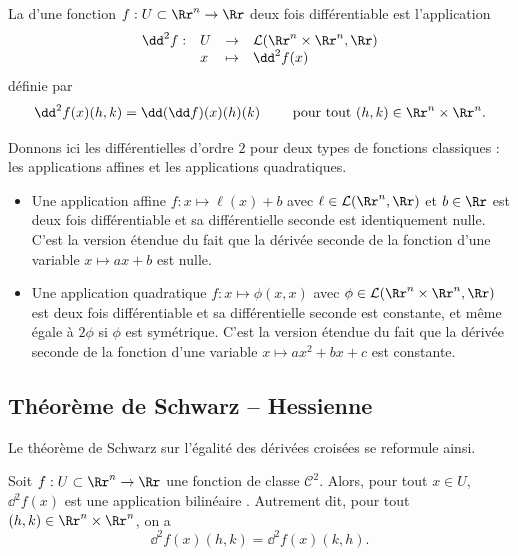 \documentclass[11pt, class=report,crop=false]{standalone}
\begin{document}
\begin{definition}
La  d'une fonction $f: U \subset \Rr^n \to \Rr$ deux fois différentiable est l'application
$$\begin{array}{clll}
\dd^2 f : & U & \rightarrow & \mathcal{L}(\Rr^n \times \Rr^n,\Rr) \\
          & x & \mapsto & \dd^2 f(x)
\end{array}$$
définie par
$$\dd^2f(x)(h,k) = \dd(\dd f)(x)(h)(k) \qquad \text{ pour tout } (h,k)\in \Rr^n \times \Rr^n.$$
\end{definition}

Donnons ici les différentielles d'ordre $2$ pour deux types de fonctions classiques : les applications affines et les applications quadratiques. 
\begin{itemize}
    \item Une application affine $f : x \mapsto \ell(x)+b$ avec $\ell \in \mathcal{L}(\Rr^n,\Rr)$ et $b \in \Rr$
    est deux fois différentiable et sa différentielle seconde est identiquement nulle.
    C'est la version étendue du fait que la dérivée seconde de la fonction d'une variable $x \mapsto ax+b$ est nulle.
    
    \item Une application quadratique $f: x \mapsto \phi(x,x)$ avec $\phi \in \mathcal{L}(\Rr^n \times \Rr^n, \Rr)$
    est deux fois différentiable et sa différentielle seconde est constante, et même égale à $2\phi$ si $\phi$ est symétrique.
    C'est la version étendue du fait que la dérivée seconde de la fonction d'une variable $x \mapsto ax^2+bx+c$ est constante.
\end{itemize}

\subsection{Théorème de Schwarz -- Hessienne}

Le théorème de Schwarz sur l'égalité des dérivées croisées se reformule ainsi.
\begin{theoreme}
Soit $f:U\subset \Rr^n\to \Rr$ une fonction de classe $\mathcal{C}^2$. 
Alors, pour tout $x \in U$, $\dd^2f(x)$ est une application bilinéaire . 
Autrement dit, pour tout $(h,k)\in \Rr^n \times \Rr^n$, on a
$$\dd^2f(x)(h,k) = \dd^2f(x)(k,h).$$
\end{theoreme}
\end{document}
